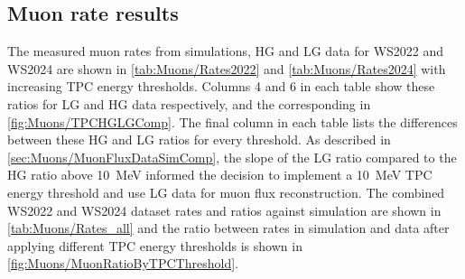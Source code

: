 \subsection{Muon rate results}\label{sec:Muons/MuonRateResults}
The measured muon rates from simulations, HG and LG data for WS2022 and WS2024 are shown in \autoref{tab:Muons/Rates2022} and \autoref{tab:Muons/Rates2024} with increasing TPC energy thresholds. Columns 4 and 6 in each table show these ratios for LG and HG data respectively, and the corresponding in \autoref{fig:Muons/TPCHGLGComp}. The final column in each table lists the differences between these HG and LG ratios for every threshold. As described in \autoref{sec:Muons/MuonFluxDataSimComp}, the slope of the LG ratio compared to the HG ratio above 10~MeV informed the decision to implement a 10~MeV TPC energy threshold and use LG data for muon flux reconstruction. The combined WS2022 and WS2024 dataset rates and ratios against simulation are shown in \autoref{tab:Muons/Rates_all} and the ratio between rates in simulation and data after applying different TPC energy thresholds is shown in \autoref{fig:Muons/MuonRatioByTPCThreshold}.

